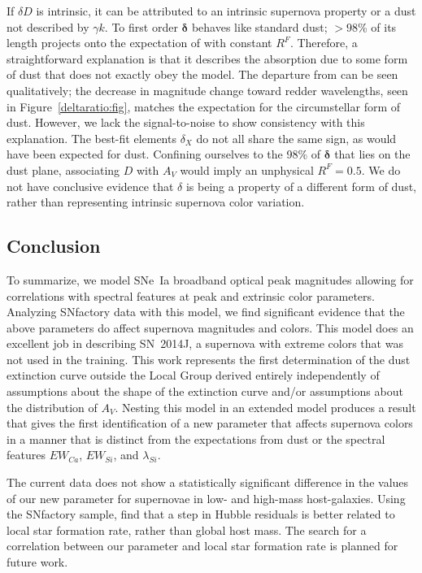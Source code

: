 \documentclass{aastex61}   	%
\begin{document}
If  $\delta D$  is intrinsic, it can be attributed to an intrinsic supernova property  or a dust not described by $\gamma k$.
To first order $\pmb{\delta}$ behaves like standard dust;   $>98$\% of its length projects onto the expectation of  
with constant $R^F$.
Therefore, a straightforward explanation is that it describes the absorption due to some form of dust
that does not exactly obey the   model.
The departure from   
can be seen qualitatively; the decrease in magnitude change toward redder wavelengths, seen in Figure~\ref{deltaratio:fig}, matches the 
expectation for the circumstellar form of dust.
However, we
lack the signal-to-noise to show consistency with this explanation.
The best-fit elements $\delta_X$ do not all share the same sign, as would have been expected for dust.
Confining ourselves to the 98\% of   $\pmb{\delta}$ that lies on the dust plane, associating 
$D$ with $A_V$ would imply an unphysical $R^F=0.5$.
We do not have conclusive evidence that  $\delta$ is being a property of a different form of dust, rather
than representing intrinsic supernova color variation.
\color{black}



\subsection{Conclusion}
To summarize, we model SNe~Ia broadband optical peak magnitudes allowing for correlations with spectral features at peak and
extrinsic color parameters.  Analyzing SNfactory data with this model, we find significant evidence that the above parameters do
affect supernova magnitudes and colors.  This model  does an excellent job in
describing SN~2014J, a supernova with extreme colors that was not used in the training.  
This work represents the first determination of the dust extinction curve outside the Local Group
derived entirely independently of assumptions about the shape of the extinction curve and/or assumptions about the
distribution of $A_V$.  
Nesting this model in an extended model produces a result that 
gives the first identification of  a new parameter that affects supernova
colors in a manner that is distinct from the expectations from dust or the spectral features $EW_{Ca}$, $EW_{Si}$, and $\lambda_{Si}$.

The current data does not show a statistically significant difference in the values of our new parameter for supernovae
in low- and high-mass host-galaxies.
Using the SNfactory sample,
\citet{2013A&A...560A..66R,2017Rigault} find that a step in Hubble residuals is better related to local star formation rate, rather than
global host mass.  The search for a correlation between our parameter and local star formation rate is planned for future work.
\end{document}
